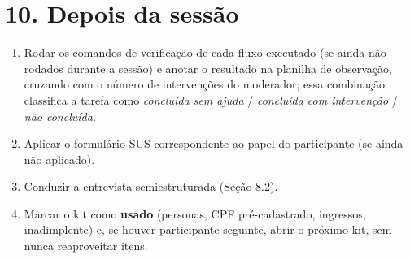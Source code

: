 \documentclass[11pt,a4paper]{article}
\begin{document}
\section*{10. Depois da sessão}

\begin{enumerate}[leftmargin=6mm]
  \item Rodar os comandos de verificação de cada fluxo executado (se ainda não rodados durante a
    sessão) e anotar o resultado na planilha de observação, cruzando com o número de intervenções
    do moderador; essa combinação classifica a tarefa como \textit{concluída sem ajuda} /
    \textit{concluída com intervenção} / \textit{não concluída}.
  \item Aplicar o formulário SUS correspondente ao papel do participante (se ainda não aplicado).
  \item Conduzir a entrevista semiestruturada (Seção 8.2).
  \item Marcar o kit como \textbf{usado} (personas, CPF pré-cadastrado, ingressos, inadimplente) e,
    se houver participante seguinte, abrir o próximo kit, sem nunca reaproveitar itens.
\end{enumerate}
\end{document}
